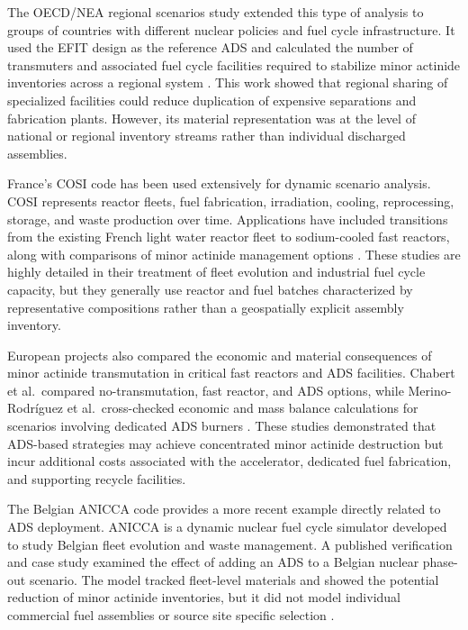 The \gls{OECD}/\gls{NEA} regional scenarios study extended this type of analysis to
groups of countries with different nuclear policies and fuel cycle
infrastructure. It used the \gls{EFIT} design as the reference \gls{ADS} and calculated
the number of transmuters and associated fuel cycle facilities required to
stabilize minor actinide inventories across a regional system
\cite{nea_regional_scenarios_2009}. This work showed that regional sharing of
specialized facilities could reduce duplication of expensive separations and
fabrication plants. However, its material representation was at the level of
national or regional inventory streams rather than individual discharged
assemblies.

France's \gls{COSI} code has been used extensively for dynamic scenario analysis.
\gls{COSI} represents reactor fleets, fuel fabrication, irradiation, cooling,
reprocessing, storage, and waste production over time. Applications have
included transitions from the existing French light water reactor fleet to
sodium-cooled fast reactors, along with comparisons of minor actinide
management options
\cite{coquelet_pascal_cosi6_2015}. These studies are highly detailed in their
treatment of fleet evolution and industrial fuel cycle capacity, but they
generally use reactor and fuel batches characterized by representative
compositions rather than a geospatially explicit assembly inventory.

European projects also compared the economic and material consequences of
minor actinide transmutation in critical fast reactors and \gls{ADS} facilities.
Chabert et al.\ compared no-transmutation, fast reactor, and \gls{ADS} options,
while Merino-Rodríguez et al.\ cross-checked economic and mass balance
calculations for scenarios involving dedicated \gls{ADS} burners
\cite{chabert_technical_2013,cross_check_2016}. These studies
demonstrated that \gls{ADS}-based strategies may achieve concentrated
minor actinide destruction but incur additional costs associated with the
accelerator, dedicated fuel fabrication, and supporting recycle facilities.

The Belgian \gls{ANICCA} code provides a more recent example directly related to
\gls{ADS} deployment. \gls{ANICCA} is a dynamic nuclear fuel cycle simulator developed
to study Belgian fleet evolution and waste management. A published
verification and case study examined the effect of adding an \gls{ADS} to a Belgian
nuclear phase-out scenario. The model tracked fleet-level materials and showed
the potential reduction of minor actinide inventories, but it did not model
individual commercial fuel assemblies or source site specific selection
\cite{rodriguez_nuclear_2020}.

